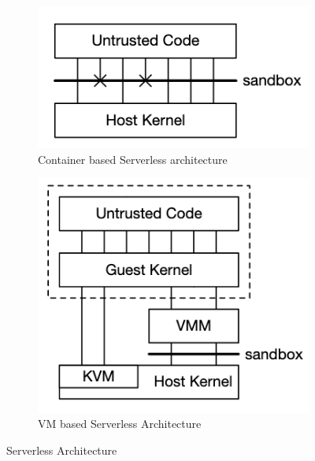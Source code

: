 \begin{figure}[!t]
\centering %
\begin{subfigure}{0.35\textwidth}
  \includegraphics[width=\linewidth]{images/container_architecture.png}
  \caption{Container based Serverless architecture \cite{firecracker}}
  \label{fig:container_serverless}
\end{subfigure} \hfil%
\begin{subfigure}{0.35\textwidth}
  \includegraphics[width=\linewidth]{images/VM_architecture.png}
  \caption{VM based Serverless Architecture \cite{firecracker}}
  \label{fig:human_memory}
\end{subfigure} \hfil%

\caption{Serverless Architecture}
\label{fig:memory}
\end{figure}

